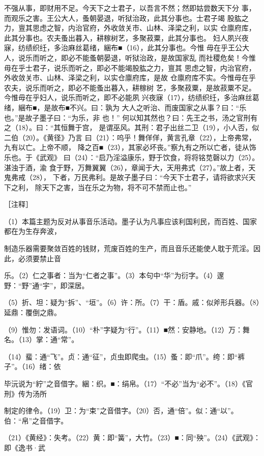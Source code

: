 \documentclass[12pt,UTF8]{ctexbook}
\begin{document}
不强从事，即财用不足。今天下之士君子，以吾言不然；然即姑尝数天下分 
事，而观乐之害。王公大人，蚤朝晏退，听狱治政，此其分事也。士君子竭 
股肱之力，亶其思虑之智，内治官府，外收敛关市、山林、泽梁之利，以实 
仓廪府库，此其分事也。农夫蚤出暮入，耕稼树艺，多聚菽粟，此其分事也。 
妇人夙兴夜寐，纺绩织纴，多治麻丝葛绪，綑布■（16），此其分事也。今惟 
毋在乎王公大人，说乐而听之，即必不能蚤朝晏退，听狱治政，是故国家乱 
而社稷危矣！今惟毋在乎士君子，说乐而听之，即必不能竭股肱之力，亶其 
思虑之智，内治官府，外收敛关市、山林、泽梁之利，以实仓廪府库，是故 
仓廪府库不实。今惟毋在乎农夫，说乐而听之，即必不能蚤出暮入，耕稼树 
艺，多聚菽粟，是故菽粟不足。今惟毋在乎妇人，说乐而听之，即不必能夙 
兴夜寐（17），纺绩织纴，多治麻丝葛绪，綑布■，是故布■不兴。曰：孰为 
大人之听治、而废国家之从事？曰：“乐也。”是故子墨子曰：“为乐，非 
也！” 
何以知其然也？曰：先王之书，汤之官刑有之（18）。曰：“其恒舞于宫， 
是谓巫风。其刑：君子出丝二卫（19），小人否，似二伯（20）。《黄径》乃言 
曰（21）：呜乎！舞佯佯，黄言孔章（22），上帝弗常，九有以亡。上帝不顺， 
降之百■（23），其家必坏丧。”察九有之所以亡者，徒从饰乐也。于《武观》 
曰（24）：“启乃淫溢康乐，野于饮食，将将铭苋磬以力（25）。湛浊于酒，渝 
食于野，万舞翼翼（26），章闻于大，天用弗式（27）。”故上者，天鬼弗戒（28）， 
下者，万民弗利。是故子墨子曰：“今天下士君子，请将欲求兴天下之利， 
除天下之害，当在乐之为物，将不可不禁而止也。” 


［注释］ 

（1）本篇主题为反对从事音乐活动。墨子认为凡事应该利国利民，而百姓、国家都在为生存奔波， 

制造乐器需要聚敛百姓的钱财，荒废百姓的生产，而且音乐还能使人耽于荒淫。因此，必须要禁止音 

乐。（2）仁之事者：当为“仁者之事”。（3）本句中“华”为衍字。（4）邃野：“野”通“宇”，即深居。 

（5）折、坦：疑为“拆”、“垣”。（6）许：所。（7）干：盾。戚：似斧形兵器。（8）延鼎：覆倒之鼎。 

（9）惟勿：发语词。（10）“朴”字疑为“行”。（11）■然：安静地。（12）万：舞名。（13）掌：通“常”。 

（14）蜚：通“飞”。贞：通“征”，贞虫即爬虫。（15）蚤：即“爪”。绔：即“裤子”。（16）绪：依 

毕沅说为“紵”之音借字。綑：织。■：绢帛。（17）“不必”当为“必不”。（18）《官刑》传为汤所 

制定的律令。（19）卫：为“束”之音借字。（20）否，通“倍”。似：通“以”。伯：“帛”之音借字。 

（21）《黄经》：失考。（22）黄：即“簧”，大竹。（23）■：同“殃”。（24）《武观》：即《逸书·武 
\end{document}
